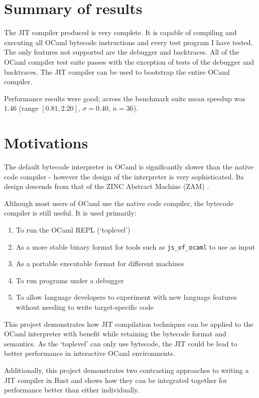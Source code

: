 \section{Summary of results}

The JIT compiler produced is very complete. It is capable of compiling and executing all OCaml
bytecode instructions and every test program I have tested. The only features not supported are
the
debugger and backtraces. All of the OCaml compiler test suite passes with the exception of tests of
the debugger and backtraces. The JIT compiler can be used to bootstrap the entire OCaml compiler.

Performance results were good; across the benchmark suite mean speedup was $1.46$ (range $[0.81,
                  2.20]$,
$\sigma = 0.40$, $n = 36$).

\section{Motivations}

The default bytecode interpreter in OCaml is significantly slower than the native code compiler -
however
the design of the interpreter is very sophisticated. Its design descends from that of the ZINC
Abstract Machine (ZAM) \cite{zinc}.

Although most users of OCaml use the native code compiler, the bytecode
compiler is still useful. It is used primarily:

\begin{enumerate}
      \item To run the OCaml REPL (`toplevel')
      \item As a more stable binary format for tools such as \texttt{js\_of\_ocaml} to use as input
      \item As a portable executable format for different machines
      \item To run programs under a debugger
      \item To allow language developers to experiment with new language features without needing
            to write target-specific code
\end{enumerate}

This project demonstrates how JIT compilation techniques can be applied to the OCaml interpreter
with benefit while retaining the bytecode format and semantics. As the `toplevel' can only use
bytecode, the JIT could be lead to better performance in interactive OCaml environments.

Additionally, this project demonstrates two contrasting approaches to writing a JIT compiler in
Rust
and shows how they can be integrated together for performance better than either individually.

